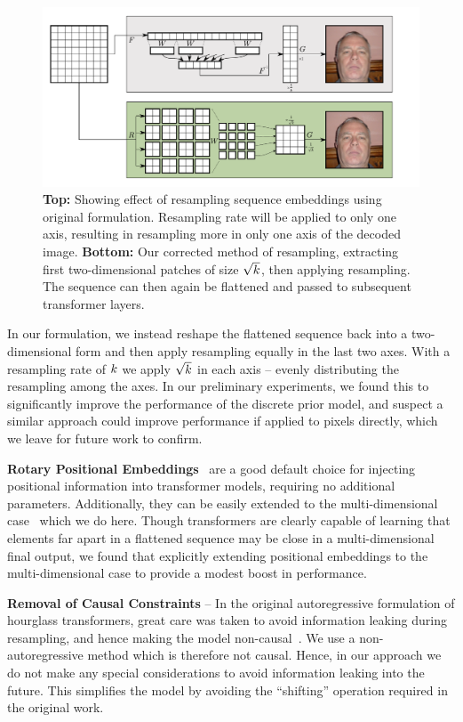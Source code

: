 \begin{figure}
    \centering
    \includegraphics[width=\textwidth]{figures/resample.pdf}
    \caption{
        \textbf{Top:} Showing effect of resampling sequence embeddings using
        original formulation. Resampling rate will be applied to only one axis,
        resulting in resampling more in only one axis of the decoded image.
        \textbf{Bottom:} Our corrected method of resampling, extracting first
        two-dimensional patches of size $\sqrt{k}$, then applying
        resampling. The sequence can then again be flattened and passed to
        subsequent transformer layers.
    }
\end{figure}


In our formulation, we instead reshape the flattened sequence back into a
two-dimensional form and then apply resampling equally in the last two axes.
With a resampling rate of $k$ we apply $\sqrt{k}$ in
each axis -- evenly distributing the resampling among the axes. In our
preliminary experiments, we found this to significantly improve the performance
of the discrete prior model, and suspect a similar approach could improve
performance if applied to pixels directly, which we leave for future work to
confirm.

\textbf{Rotary Positional Embeddings}~\cite{su2021roformer} are a good default
choice for injecting positional information into transformer models, requiring
no additional parameters. Additionally, they can be easily extended to the
multi-dimensional case~\cite{rope-eleutherai} which we do here. Though
transformers are clearly capable of learning that elements far apart in a
flattened sequence may be close in a multi-dimensional final output, we found
that explicitly extending positional embeddings to the multi-dimensional case to
provide a modest boost in performance.

\textbf{Removal of Causal Constraints} -- In the original autoregressive
formulation of hourglass transformers, great care was taken to avoid information
leaking during resampling, and hence making the model
non-causal~\cite{nawrot2021hierarchical}. We use a non-autoregressive method
which is therefore not causal. Hence, in our approach we do not make any special
considerations to avoid information leaking into the future. This simplifies the
model by avoiding the ``shifting'' operation required in the original work.

